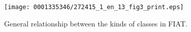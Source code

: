 \begin{figure}
  \centering
  \texttt{[image: 0001335346/272415\_1\_en\_13\_fig3\_print.eps]}
  \caption{General relationship between the kinds of classes in FIAT.}
  \label{fig:struct}
\end{figure}

\endgroup

